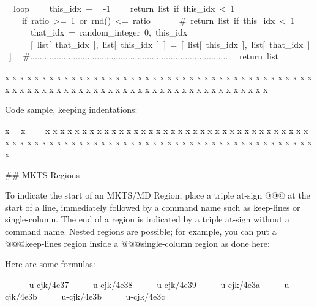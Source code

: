   loop
    this\_idx += -1
    return list if this\_idx < 1
    if ratio >= 1 or rnd() <= ratio
      \# return list if this\_idx < 1
      that\_idx = random\_integer 0, this\_idx
      [ list[ that\_idx ], list[ this\_idx ] ] = [ list[ this\_idx ], list[ that\_idx ] ]
  \#...................................................................................
  return list
\endgroup{}\begin{multicols}{2}x x x x x x x x x x x x x x x x x x x x x x x x x x
x x x x x x x x x x x x x x x x x x x x x x x x x x
x x x x x x x x x x x x x x x x x x x x x x x x x x\mktsShowpar\par
Code sample, keeping indentations:\mktsShowpar\par
\begingroup\obeyalllines\mktsStyleCode{}x
  x
    x
\endgroup{}x x x x x x x x x x x x x x x x x x x x x x x x x x
x x x x x x x x x x x x x x x x x x x x x x x x x x
x x x x x x x x x x x x x x x x x x x x x x x x x x\mktsShowpar\par
\#\# MKTS Regions \mktsShowpar\par
To indicate the start of an {\mktsStyleBold{}MKTS}/MD Region, place a triple at-sign {\mktsStyleCode{}@@@}
at the start of a line, immediately followed by a command name such as
{\mktsStyleCode{}keep-lines} or {\mktsStyleCode{}single-column}. The end of a region is indicated by a
triple at-sign without a command name. Nested regions are possible; for example,
you can put a {\mktsStyleCode{}@@@keep-lines} region inside a {\mktsStyleCode{}@@@single-column} region as
done here:\mktsShowpar\par
\end{multicols}Here are some formulas:
\mktsShowpar\par
\begingroup{}     
{\mktsStyleCode{}u-cjk/4e37}     
{\mktsStyleCode{}u-cjk/4e38}     
{\mktsStyleCode{}u-cjk/4e39}     
{\mktsStyleCode{}u-cjk/4e3a}     
{\mktsStyleCode{}u-cjk/4e3b}     
{\mktsStyleCode{}u-cjk/4e3b}     
{\mktsStyleCode{}u-cjk/4e3c}     

